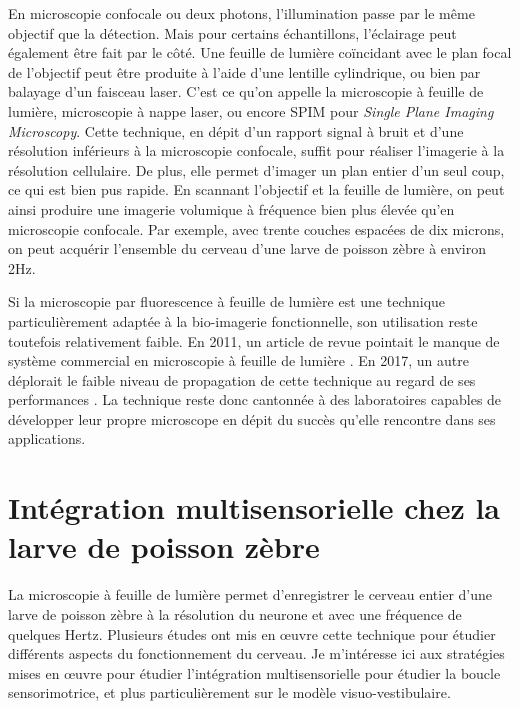 En microscopie confocale ou deux photons, l'illumination passe par le même objectif que la détection. Mais pour certains échantillons, l'éclairage peut également être fait par le côté. Une feuille de lumière coïncidant avec le plan focal de l'objectif peut être produite à l'aide d'une lentille cylindrique, ou bien par balayage d'un faisceau laser. C'est ce qu'on appelle la microscopie à feuille de lumière, microscopie à nappe laser, ou encore SPIM pour \emph{Single Plane Imaging Microscopy}. Cette technique, en dépit d'un rapport signal à bruit et d'une résolution inférieurs à la microscopie confocale, suffit pour réaliser l'imagerie à la résolution cellulaire. De plus, elle permet d'imager un plan entier d'un seul coup, ce qui est bien pus rapide. En scannant l'objectif et la feuille de lumière, on peut ainsi produire une imagerie volumique à fréquence bien plus élevée qu'en microscopie confocale. Par exemple, avec trente couches espacées de dix microns, on peut acquérir l'ensemble du cerveau d'une larve de poisson zèbre à environ 2Hz.

Si la microscopie par fluorescence à feuille de lumière est une technique particulièrement adaptée à la bio-imagerie fonctionnelle, son utilisation reste toutefois relativement faible. En 2011, un article de revue pointait le manque de système commercial en microscopie à feuille de lumière \cite{santi_light_2011}. En 2017, un autre déplorait le faible niveau de propagation de cette technique au regard de ses performances \cite{power_guide_2017}. La technique reste donc cantonnée à des laboratoires capables de développer leur propre microscope en dépit du succès qu'elle rencontre dans ses applications.



\section{Intégration multisensorielle chez la larve de poisson zèbre}

La microscopie à feuille de lumière permet d'enregistrer le cerveau entier d'une larve de poisson zèbre à la résolution du neurone et avec une fréquence de quelques Hertz. Plusieurs études ont mis en œuvre cette technique pour étudier différents aspects du fonctionnement du cerveau. Je m'intéresse ici aux stratégies mises en œuvre pour étudier l'intégration multisensorielle pour étudier la boucle sensorimotrice, et plus particulièrement sur le modèle visuo-vestibulaire.


